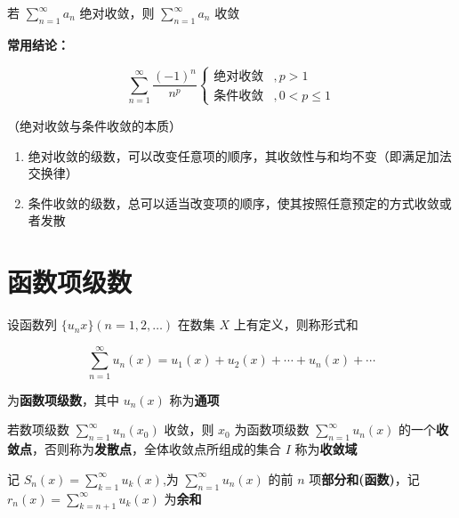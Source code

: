 \documentclass[lang = zh , final , oneside , openany , titlepage , zihao = -4 , linespread = 1.3 , baselineskip = false , cjk-font = windows , text-font = newtx , math-font = newtx]{sjtureport}
\begin{document}
\begin{definition}
\begin{definition}
    若 \(\displaystyle \sum_{n=1}^\infty a_n\) 绝对收敛，则
\(\displaystyle \sum_{n=1}^\infty a_n\) 收敛
\end{definition}

\begin{remark}
    \textbf{常用结论：}

\[\displaystyle \sum_{n=1}^\infty \frac{(-1)^{n}}{n^p}\begin{cases}\text{绝对收敛} & ,p>1\\ \text{条件收敛} & , 0 < p\leq 1 \end{cases}\]
\end{remark}

\begin{definition}
    （绝对收敛与条件收敛的本质）
    \begin{enumerate}
\def\labelenumi{\arabic{enumi}.}
\item
  绝对收敛的级数，可以改变任意项的顺序，其收敛性与和均不变（即满足加法交换律）
\item
  条件收敛的级数，总可以适当改变项的顺序，使其按照任意预定的方式收敛或者发散
\end{enumerate}
\end{definition}

\section{函数项级数}

\begin{definition}
    设函数列 \(\{u_n{x}\} (n=1,2,\ldots)\) 在数集 \(X\) 上有定义，则称形式和

\[\sum_{n=1}^\infty u_n(x)= u_1(x) + u_2(x) + \cdots + u_n(x) + \cdots\]

为\textbf{函数项级数}，其中 \(u_n(x)\) 称为\textbf{通项}
\end{definition}

\begin{definition}
    若数项级数 \(\displaystyle \sum_{n=1}^\infty u_n(x_0)\) 收敛，则 \(x_0\)
为函数项级数 \(\displaystyle \sum_{n=1}^\infty u_n(x)\)
的一个\textbf{收敛点}，否则称为\textbf{发散点}，全体收敛点所组成的集合
\(I\) 称为\textbf{收敛域}
\end{definition}

\begin{definition}
    记 \(\displaystyle S_n(x) =\sum_{k=1}^\infty u_k(x)\),为
\(\displaystyle \sum_{n=1}^\infty u_n(x)\) 的前 \(n\)
项\textbf{部分和(函数)}，记
\(\displaystyle r_n(x) = \sum_{k=n+1}^\infty u_k(x)\) 为\textbf{余和}
\end{definition}


\end{definition}
\end{document}
